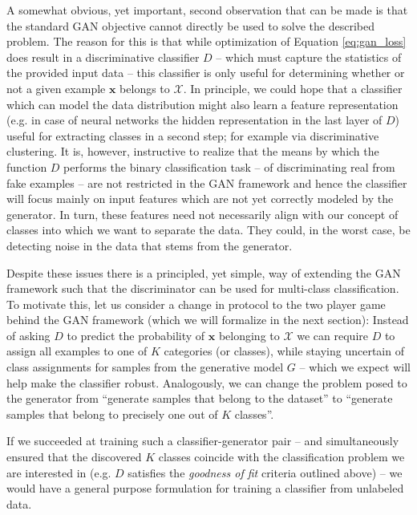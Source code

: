 \documentclass{article} \usepackage{iclr2016_conference,times}
\newcommand{\bx}{\mathbf{x}}
\begin{document}
A somewhat obvious, yet important, second observation that can be made
is that the standard GAN objective cannot directly be used to solve
the described problem.  The reason for this is that while optimization
of Equation \eqref{eq:gan_loss} does result in a discriminative
classifier $D$ -- which must capture the statistics of the provided
input data -- this classifier is only useful for determining whether
or not a given example $\bx$ belongs to $\mathcal{X}$. In principle, we
could hope that a classifier which can model the data distribution
might also learn a feature representation (e.g. in case of neural
networks the hidden representation in the last layer of $D$) useful
for extracting classes in a second step; for example via
discriminative clustering.  It is, however, instructive to realize
that the means by which the function $D$ performs the binary
classification task -- of discriminating real from fake examples --
are not restricted in the GAN framework and hence the classifier will
focus mainly on input features which are not yet correctly modeled by
the generator. In turn, these features need not necessarily align with
our concept of classes into which we want to separate the data. They
could, in the worst case, be detecting noise in the data that stems
from the generator.

Despite these issues there is a principled, yet simple, way of
extending the GAN framework such that the discriminator can be used
for multi-class classification. To motivate this, let us consider
a change in protocol to the two player game behind the GAN framework (which
we will formalize in the next section): 
Instead of asking $D$ to predict the probability of $\bx$ belonging to
$\mathcal{X}$ we can require $D$ to assign all examples to one of $K$
categories (or classes), while staying uncertain of class assignments for
samples from the generative model $G$ -- which we expect will help make
the classifier robust. 
Analogously, we can change the problem posed to the generator from
``generate samples that belong to the dataset'' to ``generate samples
that belong to precisely one out of $K$ classes''.

If we succeeded at training such a classifier-generator pair --
and simultaneously ensured that the discovered $K$ classes
coincide with the classification problem we are interested in
(e.g. $D$ satisfies the \emph{goodness of fit} criteria outlined above) -- we
would have a general purpose formulation for training a classifier
from unlabeled data.
\end{document}
